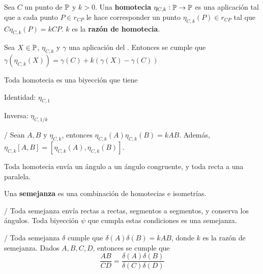  Sea $C$ un punto de $\P$ y $k > 0$. Una \textbf{homotecia} $\eta_{C,k}:\P \rightarrow \P$ es una aplicación tal que a cada punto $P \in r_{CP}$ le hace corresponder un punto $\eta_{C,k}(P) \in r_{CP}$ tal que $C\eta_{C,k}(P) = kCP$. $k$ es la \textbf{razón de homotecia}.

 Sea $X \in \P$, $\eta_{C,k}$ y $\gamma$ una aplicación del . Entonces se cumple que $\gamma(\eta_{C,k}(X)) = \gamma(C) + k(\gamma(X)-\gamma(C))$

 Toda homotecia es una biyección que tiene
\begin{itemizex}
	\item Identidad: $\eta_{C,1}$
	\item Inversa: $\eta_{C,1/k}$
\end{itemizex}

/ Sean $A, B$ y $\eta_{C,k}$, entonces $\eta_{C,k}(A)\eta_{C,k}(B) = kAB$. Además, $\eta_{C,k}[A,B] = [\eta_{C,k}(A), \eta_{C,k}(B)]$.

\obligatorio{}

\obligatorio{}
 Toda homotecia envía un ángulo a un ángulo congruente, y toda recta a una paralela.

 Una \textbf{semejanza} es una combinación de homotecias e isometrías.

 /  Toda semejanza envía rectas a rectas, segmentos a segmentos, y conserva los ángulos. Toda biyección $\psi$ que cumpla estas condiciones es una semejanza.

 /  Toda semejanza $\delta$ cumple que $\delta(A)\delta(B) = kAB$, donde $k$ es la razón de semejanza. Dados $A,B,C,D$, entonces se cumple que 
$$\frac{AB}{CD} = \frac{\delta(A)\delta(B)}{\delta(C)\delta(D)}$$
\obligatorio {}

